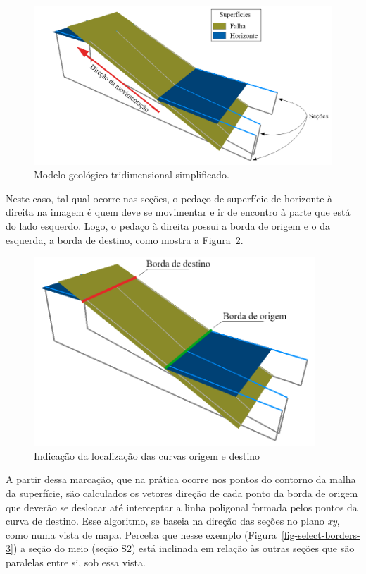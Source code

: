 \begin{figure} [H]
  \begin{center}
    \includegraphics[width=350pt]{images/fig-select-borders-1}
    \caption{Modelo geológico tridimensional simplificado.}\label{fig-select-borders-1}
  \end{center}
\end{figure}

Neste caso, tal qual ocorre nas seções, o pedaço de superfície de horizonte à direita na imagem é quem deve se movimentar e ir de encontro à parte que está do lado esquerdo. Logo, o pedaço à direita possui a borda de origem e o da esquerda, a borda de destino, como mostra a Figura~\ref{fig-select-borders-2}.

\begin{figure} [H]
  \begin{center}
    \includegraphics[width=300pt]{images/fig-select-borders-2}
    \caption{Indicação da localização das curvas origem e destino}\label{fig-select-borders-2}
  \end{center}
\end{figure}

A partir dessa marcação, que na prática ocorre nos pontos do contorno da malha da superfície, são calculados os vetores direção de cada ponto da borda de origem que deverão se deslocar até interceptar a linha poligonal formada pelos pontos da curva de destino. Esse algoritmo, se baseia na direção das seções no plano \textit{xy}, como numa vista de mapa. Perceba que nesse exemplo (Figura~\ref{fig-select-borders-3}) a seção do meio (seção S2) está inclinada em relação às outras seções que são paralelas entre si, sob essa vista.

